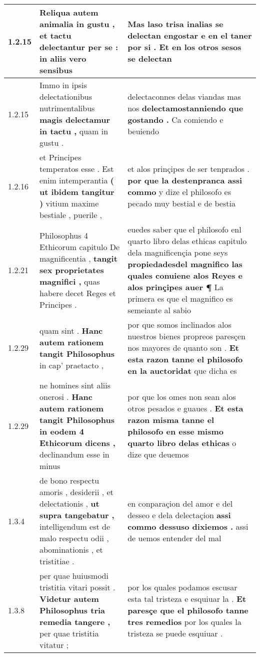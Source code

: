 \begin{tabular}{|p{1cm}|p{6.5cm}|p{6.5cm}|}
1.2.15 & Reliqua autem animalia in gustu , \textbf{ et tactu delectantur per se : } in aliis vero sensibus & Mas laso trisa inalias se delectan engostar \textbf{ e en el taner por si . } Et en los otros sesos se delectan \\\hline
1.2.15 & Immo in ipsis delectationibus nutrimentalibus \textbf{ magis delectamur in tactu , } quam in gustu . & delectaconnes delas viandas mas nos \textbf{ delectamostanniendo que gostando . } Ca comiendo e beuiendo \\\hline
1.2.16 & et Principes temperatos esse . Est enim intemperantia \textbf{ ( ut ibidem tangitur ) } vitium maxime bestiale , puerile , & et alos prinçipes de ser tenprados . \textbf{ por que la destenpranca assi commo } y dize el philosofo es pecado muy bestial e de bestia \\\hline
1.2.21 & Philosophus 4 Ethicorum capitulo De magnificentia , \textbf{ tangit sex proprietates magnifici , } quas habere decet Reges et Principes . & euedes saber que el philosofo enl quarto libro delas ethicas capitulo dela magnificençia pone seys \textbf{ propiedadesdel magnifico las quales conuiene alos Reyes e alos prinçipes auer ¶ } La primera es que el magnifico es semeiante al sabio \\\hline
1.2.29 & quam sint . \textbf{ Hanc autem rationem tangit Philosophus } in cap’ praetacto , & por que somos inclinados alos nuestros bienes propreos paresçen nos mayores de quanto son . \textbf{ Et esta razon tanne el philosofo en la auctoridat } que dicha es \\\hline
1.2.29 & ne homines sint aliis onerosi . \textbf{ Hanc autem rationem tangit Philosophus in eodem 4 Ethicorum dicens , } declinandum esse in minus & por que los omes non sean alos otros pesados e guaues . \textbf{ Et esta razon misma tanne el philosofo en esse mismo quarto libro delas ethicas } o dize que deuemos \\\hline
1.3.4 & de bono respectu amoris , desiderii , et delectationis , \textbf{ ut supra tangebatur , } intelligendum est de malo respectu odii , abominationis , et tristitiae . & en conparaçion del amor e del desseo e dela delectaçion \textbf{ assi commo dessuso dixiemos . } assi de uemos entender del mal \\\hline
1.3.8 & per quae huiusmodi tristitia vitari possit . \textbf{ Videtur autem Philosophus tria remedia tangere , } per quae tristitia vitatur ; & por los quales podamos escusar esta tal tristeza e esquiuar la . \textbf{ Et paresçe que el philosofo tanne tres remedios } por los quales la tristeza se puede esquiuar . \\\hline

\end{tabular}
